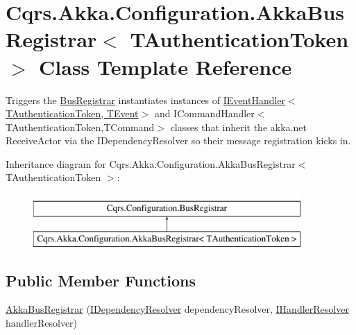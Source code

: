 \hypertarget{classCqrs_1_1Akka_1_1Configuration_1_1AkkaBusRegistrar}{}\section{Cqrs.\+Akka.\+Configuration.\+Akka\+Bus\+Registrar$<$ T\+Authentication\+Token $>$ Class Template Reference}
\label{classCqrs_1_1Akka_1_1Configuration_1_1AkkaBusRegistrar}


Triggers the \hyperlink{classCqrs_1_1Configuration_1_1BusRegistrar_a4a934d21a535b28af6c67154512bba20}{Bus\+Registrar} instantiates instances of \hyperlink{interfaceCqrs_1_1Events_1_1IEventHandler}{I\+Event\+Handler$<$\+T\+Authentication\+Token, T\+Event$>$} and I\+Command\+Handler$<$\+T\+Authentication\+Token,\+T\+Command$>$ classes that inherit the akka.\+net Receive\+Actor via the I\+Dependency\+Resolver so their message registration kicks in.  


Inheritance diagram for Cqrs.\+Akka.\+Configuration.\+Akka\+Bus\+Registrar$<$ T\+Authentication\+Token $>$\+:\begin{figure}[H]
\begin{center}
\leavevmode
\includegraphics[height=2.000000cm]{classCqrs_1_1Akka_1_1Configuration_1_1AkkaBusRegistrar}
\end{center}
\end{figure}
\subsection*{Public Member Functions}
\begin{DoxyCompactItemize}
\item 
\hyperlink{classCqrs_1_1Akka_1_1Configuration_1_1AkkaBusRegistrar_a49ab48e3305b6eb17f2a68fc2996a988}{Akka\+Bus\+Registrar} (\hyperlink{interfaceCqrs_1_1Configuration_1_1IDependencyResolver}{I\+Dependency\+Resolver} dependency\+Resolver, \hyperlink{interfaceCqrs_1_1Akka_1_1Configuration_1_1IHandlerResolver}{I\+Handler\+Resolver} handler\+Resolver)
\end{DoxyCompactItemize}
